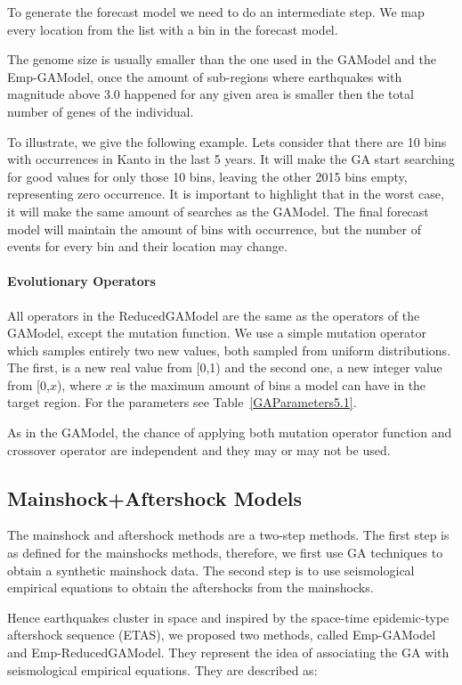 To generate the forecast model we need to do an intermediate step. We map every location from the list with a bin in the forecast model.

The genome size is usually smaller than the one used in the GAModel and the Emp-GAModel, once the amount of sub-regions where earthquakes with magnitude above 3.0 happened for any given area is smaller then the total number of genes of the individual.

To illustrate, we give the following example. Lets consider that there are 10 bins with occurrences in Kanto in the last 5 years. It will make the GA start searching for good values for only those 10 bins, leaving the other 2015 bins empty, representing zero occurrence. It is important to highlight that in the worst case, it will make the same amount of searches as the GAModel. The final forecast model will maintain the amount of bins with occurrence, but the number of events for every bin and their location may change.


\paragraph{\textbf{Evolutionary Operators}}\label{ReducedOperators}
All operators in the ReducedGAModel are the same as the operators of the GAModel, except the mutation function. We use a simple mutation operator which samples entirely two new values, both sampled from uniform distributions. The first, is a new real value from [0,1) and the second one, a new integer value from [0,$x$), where $x$ is the maximum amount of bins a model can have in the target region. For the parameters see Table~\ref{GAParameters5.1}.

As in the GAModel, the chance of applying both mutation operator function and crossover operator are independent and they may or may not be used.

\subsection{Mainshock+Aftershock Models}
The mainshock and aftershock methods are a two-step methods. The first step is as defined for the mainshocks methods, therefore, we first use GA techniques to obtain a synthetic mainshock data. The second step is to use seismological empirical equations to obtain the aftershocks from the mainshocks.


Hence earthquakes cluster in space and inspired by the space-time epidemic-type aftershock sequence (ETAS), we proposed two methods, called Emp-GAModel and Emp-ReducedGAModel. They represent the idea of associating the GA with seismological empirical equations. They are described as:

